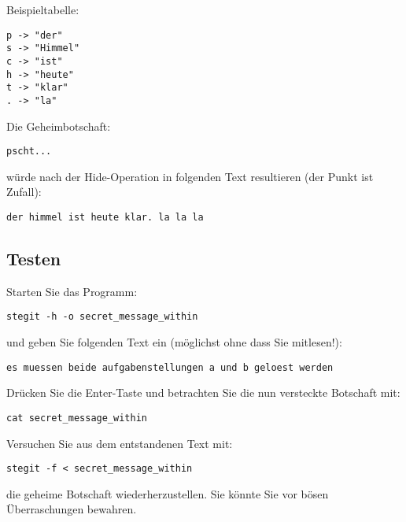 Beispieltabelle:
\begin{verbatim}
p -> "der"
s -> "Himmel"
c -> "ist"
h -> "heute"
t -> "klar"
. -> "la"
\end{verbatim}
Die Geheimbotschaft:
\begin{verbatim}
pscht...
\end{verbatim}
würde nach der Hide-Operation in folgenden Text resultieren (der Punkt ist
Zufall):
\begin{verbatim}
der himmel ist heute klar. la la la
\end{verbatim}

\subsection*{Testen}
Starten Sie das Programm:
\begin{verbatim}
stegit -h -o secret_message_within
\end{verbatim}
und geben Sie folgenden Text ein (möglichst ohne dass Sie mitlesen!):
\begin{verbatim}
es muessen beide aufgabenstellungen a und b geloest werden
\end{verbatim}
Drücken Sie die Enter-Taste und betrachten Sie die nun versteckte Botschaft mit:
\begin{verbatim}
cat secret_message_within
\end{verbatim}
Versuchen Sie aus dem entstandenen Text mit:
\begin{verbatim}
stegit -f < secret_message_within
\end{verbatim}
die geheime Botschaft wiederherzustellen. Sie könnte Sie vor bösen
Überraschungen bewahren.

\osueguidelinesone



